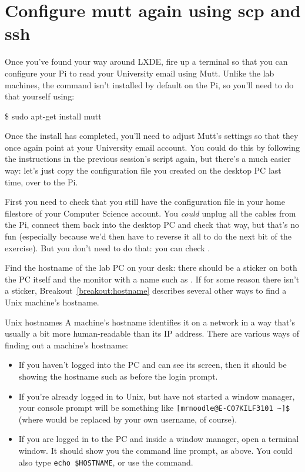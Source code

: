 \section{Configure mutt again using scp and ssh}

Once you've found your way around LXDE, fire up a terminal so that you can configure your Pi to read your University email using Mutt. Unlike the lab machines, the  command isn't installed by default on the Pi, so you'll need to do that yourself using:

\begin{ttoutenv}
\$ sudo apt-get install mutt
\end{ttoutenv}

Once the install has completed, you'll need to adjust Mutt's settings so that they once again point at your University email account. You could do this by following the instructions in the previous session's script again, but there's a much easier way: let's just copy the configuration file you created on the desktop PC last time, over to the Pi. 

First you need to check that you still have the  configuration file in your home filestore of your Computer Science account. You \textit{could} unplug all the cables from the Pi, connect them back into the desktop PC and check that way, but that's no fun (especially because we'd then have to reverse it all to do the next bit of the exercise). But you don't need to do that: you can check . 

Find the hostname of the lab PC on your desk: there should be a sticker on both the PC itself and the monitor with a name such as . If for some reason there isn't a sticker, Breakout~\ref{breakout:hostname} describes  several other ways to find a Unix machine's hostname. 


\begin{linux}{Unix hostnames}
\label{breakout:hostname}
A machine's hostname identifies it on a network in a way that's usually a bit more human-readable than its IP address. There are various ways of finding out a machine's hostname:

\begin{itemize}
\item If you haven't logged into the PC and can see its screen, then it should be showing the hostname such as  before the login prompt. 
\item If you're already logged in to Unix, but have not started a window manager, your console prompt will be something like  \verb|[mrnoodle@E-C07KILF3101 ~]$| (where  would be replaced by your own username, of course).
\item If you are logged in to the PC and inside a window manager, open a terminal window. It should show you the command line prompt, as above. You could also type \verb|echo $HOSTNAME|, or use the  command.
\end{itemize}
\end{linux}

